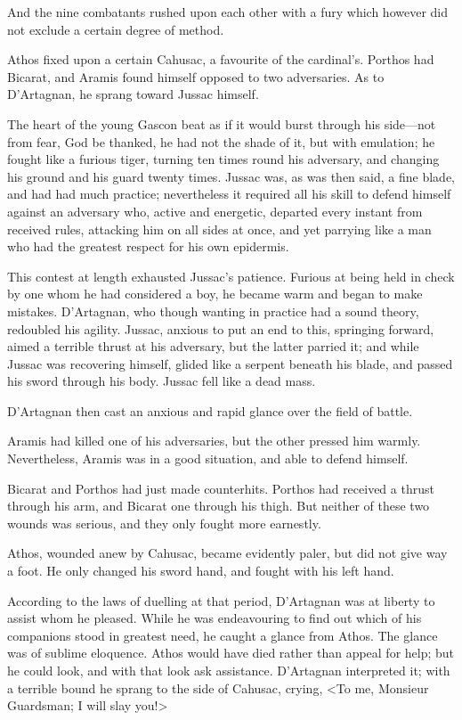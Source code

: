 And the nine combatants rushed upon each other with a fury which however did not exclude a certain degree of method. 

Athos fixed upon a certain Cahusac, a favourite of the cardinal's. Porthos had Bicarat, and Aramis found himself opposed to two adversaries. As to D'Artagnan, he sprang toward Jussac himself. 

The heart of the young Gascon beat as if it would burst through his side—not from fear, God be thanked, he had not the shade of it, but with emulation; he fought like a furious tiger, turning ten times round his adversary, and changing his ground and his guard twenty times. Jussac was, as was then said, a fine blade, and had had much practice; nevertheless it required all his skill to defend himself against an adversary who, active and energetic, departed every instant from received rules, attacking him on all sides at once, and yet parrying like a man who had the greatest respect for his own epidermis. 

This contest at length exhausted Jussac's patience. Furious at being held in check by one whom he had considered a boy, he became warm and began to make mistakes. D'Artagnan, who though wanting in practice had a sound theory, redoubled his agility. Jussac, anxious to put an end to this, springing forward, aimed a terrible thrust at his adversary, but the latter parried it; and while Jussac was recovering himself, glided like a serpent beneath his blade, and passed his sword through his body. Jussac fell like a dead mass. 

D'Artagnan then cast an anxious and rapid glance over the field of battle. 

Aramis had killed one of his adversaries, but the other pressed him warmly. Nevertheless, Aramis was in a good situation, and able to defend himself. 

Bicarat and Porthos had just made counterhits. Porthos had received a thrust through his arm, and Bicarat one through his thigh. But neither of these two wounds was serious, and they only fought more earnestly. 

Athos, wounded anew by Cahusac, became evidently paler, but did not give way a foot. He only changed his sword hand, and fought with his left hand. 

According to the laws of duelling at that period, D'Artagnan was at liberty to assist whom he pleased. While he was endeavouring to find out which of his companions stood in greatest need, he caught a glance from Athos. The glance was of sublime eloquence. Athos would have died rather than appeal for help; but he could look, and with that look ask assistance. D'Artagnan interpreted it; with a terrible bound he sprang to the side of Cahusac, crying, <To me, Monsieur Guardsman; I will slay you!> 

